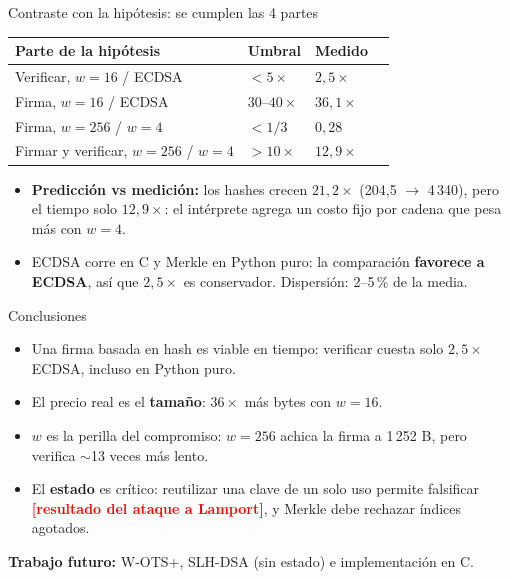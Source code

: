 \documentclass[aspectratio=169,11pt]{beamer}
\newif\ifborrador \borradortrue   %
\newcommand{\pend}[1]{\ifborrador\textcolor{red}{\textbf{[#1]}}\fi}
\newcommand{\ok}{\textcolor{green!50!black}{\checkmark}}
\begin{document}
\begin{frame}{Contraste con la hipótesis: se cumplen las 4 partes}
  \centering
  \begin{tabular}{llll}
    \toprule
    Parte de la hipótesis & Umbral & Medido & \\
    \midrule
    Verificar, $w=16$ / ECDSA       & $< 5\times$        & $2{,}5\times$  & \ok \\
    Firma, $w=16$ / ECDSA           & $30$–$40\times$    & $36{,}1\times$ & \ok \\
    Firma, $w=256$ / $w=4$          & $< 1/3$            & $0{,}28$       & \ok \\
    Firmar y verificar, $w=256$ / $w=4$ & $> 10\times$   & $12{,}9\times$ & \ok \\
    \bottomrule
  \end{tabular}
  \vspace{1em}
  \begin{itemize}
    \item \textbf{Predicción vs medición:} los hashes crecen $21{,}2\times$ (204,5 $\to$ 4\,340), pero el
          tiempo solo $12{,}9\times$: el intérprete agrega un costo fijo por cadena que pesa más con $w=4$.
    \item ECDSA corre en C y Merkle en Python puro: la comparación \textbf{favorece a ECDSA}, así que
          $2{,}5\times$ es conservador. Dispersión: 2–5\,\% de la media.
  \end{itemize}
\end{frame}

\begin{frame}{Conclusiones}
  \begin{itemize}
    \item Una firma basada en hash es viable en tiempo: verificar cuesta solo $2{,}5\times$ ECDSA,
          incluso en Python puro.
    \item El precio real es el \textbf{tamaño}: $36\times$ más bytes con $w=16$.
    \item $w$ es la perilla del compromiso: $w=256$ achica la firma a 1\,252 B, pero verifica
          $\sim$13 veces más lento.
    \item El \textbf{estado} es crítico: reutilizar una clave de un solo uso permite falsificar
          \pend{resultado del ataque a Lamport}, y Merkle debe rechazar índices agotados.
  \end{itemize}
  \vspace{0.6em}
  \textbf{Trabajo futuro:} W-OTS+, SLH-DSA (sin estado) e implementación en C.
\end{frame}
\end{document}
